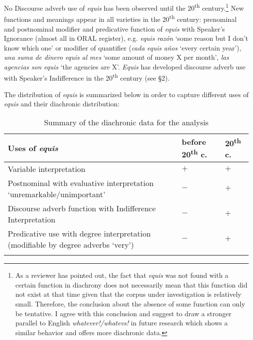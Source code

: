 \documentclass[output=paper
,modfonts
,nonflat]{langsci/langscibook}
\begin{document}
No Discourse adverb use of \textit{equis} has been observed until the 20\textsuperscript{th} century.\footnote{As a reviewer has pointed out, the fact that \textit{equis} was not found with a certain function in diachrony does not necessarily mean that this function did not exist at that time given that the corpus under investigation is relatively small. Therefore, the conclusion about the absence of some function can only be tentative. I agree with this conclusion and suggest to draw a stronger parallel to English \textit{whatever!/whatevs!} in future research which shows a similar behavior and offers more diachronic data.}
New functions and meanings appear in all varieties in the 20\textsuperscript{th} century: prenominal and postnominal modifier and predicative function of \textit{equis} with Speaker’s Ignorance (almost all in ORAL register), e.g. \textit{equis razón} ‘some reason but I don’t know which one’ or modifier of quantifier (\textit{cada equis años} ‘every certain year’), \textit{una suma de dinero equis al mes} ‘some amount of money X per month’, \textit{las agencias son equis} ‘the agencies are X’. \textit{Equis} has developed discourse adverb use with Speaker’s Indifference in the  20\textsuperscript{th} century (see §2).
 
The distribution of \textit{equis} is summarized below in order to capture different uses of \textit{equis} and their diachronic distribution:

\begin{table}\small
\caption{Summary of the diachronic data for the analysis}
\label{tab:4:Summary}
\setlength{\tabcolsep}{8pt}
 \begin{tabular}{p{4cm} p{2cm} p{2cm}}
  \lsptoprule
    Uses of \textit{equis} & \textbf{before 20}\textsuperscript{th} \textbf{c.} & \textbf{20}\textsuperscript{th} \textbf{c.}\\ 
  \toprule
   \raggedright Variable interpretation & $+$\cellcolor[gray]{0.5} & $+$\cellcolor[gray]{0.5}\\
  \midrule
   \raggedright Postnominal with evaluative interpretation ‘unremarkable/unimportant’ & $-$ & $+$\cellcolor[gray]{0.5}\\
  \midrule
   \raggedright Discourse adverb function with  Indifference Interpretation & $-$ & $+$\cellcolor[gray]{0.5}\\
  \midrule
   \raggedright Predicative use with degree interpretation (modifiable by degree adverbs ‘very’) & $-$ & $+$\cellcolor[gray]{0.5}\\
  \lspbottomrule
 \end{tabular}
\end{table}
\end{document}
